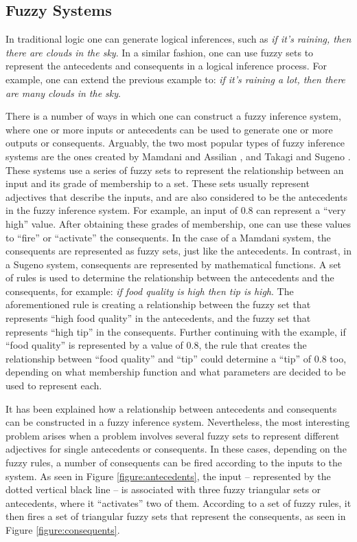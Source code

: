\documentclass[review]{elsarticle}
\begin{document}
\subsection{Fuzzy Systems}
\label{subsection:fuzzy-systems}


In traditional logic one can generate logical inferences, such as \textit{if it's raining, then there are clouds in the sky}. In a similar fashion, one can use fuzzy sets to represent the antecedents and consequents in a logical inference process. For example, one can extend the previous example to: \textit{if it's raining a lot, then there are many clouds in the sky}.

There is a number of ways in which one can construct a fuzzy inference system, where one or more inputs or antecedents can be used to generate one or more outputs or consequents. Arguably, the two most popular types of fuzzy inference systems are the ones created by Mamdani and Assilian \cite{Mamdani1975}, and Takagi and Sugeno \cite{Takagi1985}. These systems use a series of fuzzy sets to represent the relationship between an input and its grade of membership to a set. These sets usually represent adjectives that describe the inputs, and are also considered to be the antecedents in the fuzzy inference system. For example, an input of 0.8 can represent a ``very high'' value. After obtaining these grades of membership, one can use these values to ``fire'' or ``activate'' the consequents. In the case of a Mamdani system, the consequents are represented as fuzzy sets, just like the antecedents. In contrast, in a Sugeno system, consequents are represented by mathematical functions. A set of rules is used to determine the relationship between the antecedents and the consequents, for example: \textit{if food quality is high then tip is high}. The aforementioned rule is creating a relationship between the fuzzy set that represents ``high food quality'' in the antecedents, and the fuzzy set that represents ``high tip'' in the consequents. Further continuing with the example, if ``food quality'' is represented by a value of 0.8, the rule that creates the relationship between ``food quality'' and ``tip'' could determine a ``tip'' of 0.8 too, depending on what membership function and what parameters are decided to be used to represent each.

It has been explained how a relationship between antecedents and consequents can be constructed in a fuzzy inference system. Nevertheless, the most interesting problem arises when a problem involves several fuzzy sets to represent different adjectives for single antecedents or consequents. In these cases, depending on the fuzzy rules, a number of consequents can be fired according to the inputs to the system. As seen in Figure \ref{figure:antecedents}, the input -- represented by the dotted vertical black line -- is associated with three fuzzy triangular sets or antecedents, where it ``activates'' two of them. According to a set of fuzzy rules, it then fires a set of triangular fuzzy sets that represent the consequents, as seen in Figure \ref{figure:consequents}.
\end{document}
